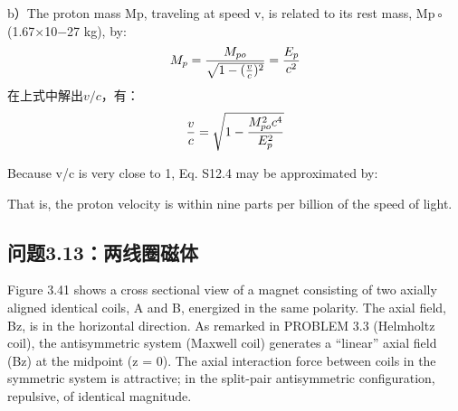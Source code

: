 b）The proton mass Mp, traveling at speed v, is related to its rest mass, Mp◦
(1.67×10−27 kg), by:
$$
M_{p}=\frac{M_{po}}{\sqrt{1-(\frac{v}{c})^{2}}}=\frac{E_{p}}{c^{2}}\\%
$$
在上式中解出$v/c$，有：
$$
\frac{v}{c}=\sqrt{1-\frac{M_{po}^{2}c^{4}}{E_{p}^{2}}}\\%
$$

Because v/c is very close to 1, Eq. S12.4 may be approximated by:

That is, the proton velocity is within nine parts per billion of the speed of light.
\newpage



\subsection{问题3.13：两线圈磁体}
Figure 3.41 shows a cross sectional view of a magnet consisting of two axially
aligned identical coils, A and B, energized in the same polarity. The axial field,
Bz, is in the horizontal direction. As remarked in PROBLEM 3.3 (Helmholtz coil),
the antisymmetric system (Maxwell coil) generates a “linear” axial field (Bz) at
the midpoint (z = 0). The axial interaction force between coils in the symmetric
system is attractive; in the split-pair antisymmetric configuration, repulsive, of
identical magnitude.

